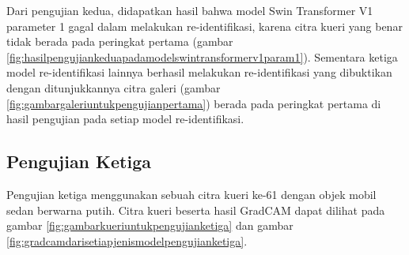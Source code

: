 Dari pengujian kedua, didapatkan hasil bahwa model Swin Transformer V1 parameter 1 gagal dalam melakukan re-identifikasi, 
karena citra kueri yang benar tidak berada pada peringkat pertama (gambar 
\ref{fig:hasilpengujiankeduapadamodelswintransformerv1param1}). Sementara ketiga model re-identifikasi lainnya berhasil 
melakukan re-identifikasi yang dibuktikan dengan ditunjukkannya citra galeri (gambar \ref{fig:gambargaleriuntukpengujianpertama})
berada pada peringkat pertama di hasil pengujian pada setiap model re-identifikasi.

\subsection{Pengujian Ketiga}

Pengujian ketiga menggunakan sebuah citra kueri ke-61 dengan objek mobil sedan \linebreak berwarna putih. Citra kueri 
beserta hasil GradCAM dapat dilihat pada gambar \ref{fig:gambarkueriuntukpengujianketiga} dan gambar 
\ref{fig:gradcamdarisetiapjenismodelpengujianketiga}.

